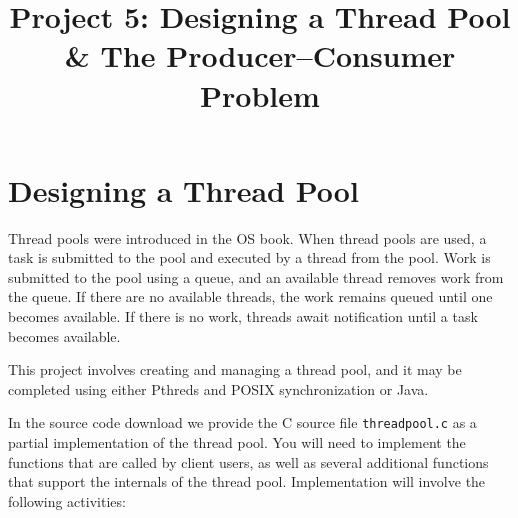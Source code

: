 \documentclass[UTF8,10pt,a4paper]{article}
\title{Project 5: Designing a Thread Pool & The Producer–Consumer Problem}
\date{}
\theoremstyle{Problem}
\theoremstyle{Solution}
\begin{document}
\maketitle
\thispagestyle{FirstPageStyle}

\section{Designing a Thread Pool}

Thread pools were introduced in the OS book. When thread pools are used, a task is submitted to the pool and executed by a thread from the pool. Work is submitted to the pool using a queue, and an available thread removes work from the queue. If there are no available threads, the work remains queued until one becomes available. If there is no work, threads await notification until
a task becomes available.

This project involves creating and managing a thread pool, and it may be completed using either Pthreds and POSIX synchronization or Java.

In the source code download we provide the C source file \texttt{threadpool.c} as a partial implementation of the thread pool. You will need to implement the functions that are called by client users, as well as several additional functions that support the internals of the thread pool. Implementation will involve the following activities:
\end{document}
